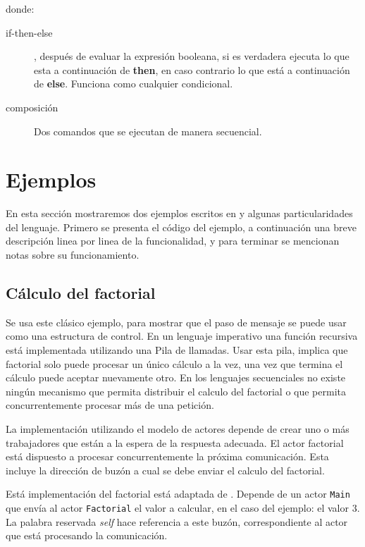 donde:

\begin{description}
\item [if-then-else], después de evaluar la expresión booleana, si es verdadera
  ejecuta lo que esta a continuación de \textbf{then}, en caso contrario lo que está a
  continuación de \textbf{else}. Funciona como cualquier condicional.
\item [composición] Dos comandos que se ejecutan de manera secuencial.

\end{description}

\section{Ejemplos}

En esta sección mostraremos dos ejemplos escritos en \SAL y algunas particularidades del lenguaje. Primero se presenta el código del ejemplo, a continuación una breve descripción linea por linea de la funcionalidad, y para terminar se mencionan notas sobre su funcionamiento.

\subsection{Cálculo del factorial}\label{sal:factorial}

Se usa este clásico ejemplo, para mostrar que el paso de mensaje se puede usar como una estructura de control. En un lenguaje imperativo una función recursiva está implementada utilizando una Pila de llamadas. Usar esta pila, implica que factorial solo puede procesar un único cálculo a la vez, una vez que termina el cálculo puede aceptar nuevamente otro. En los lenguajes secuenciales no existe ningún mecanismo que permita distribuir el calculo del factorial o que permita concurrentemente procesar más de una petición.

La implementación utilizando el modelo de actores depende de crear uno o más trabajadores que están a la espera de la respuesta adecuada. El actor factorial está dispuesto a procesar concurrentemente la próxima comunicación. Esta incluye la dirección de buzón a cual se debe enviar el calculo del factorial.

Está implementación del factorial está adaptada de \cite{Agha:1986:AMC:7929}. Depende de un actor \lstinline[language=sal, style=simple]$Main$ que envía al actor \lstinline[language=sal, style=simple]$Factorial$ el valor a calcular, en el caso del ejemplo: el valor $3$. La palabra reservada \textit{self} hace referencia a este buzón, correspondiente al actor que está procesando la comunicación.

